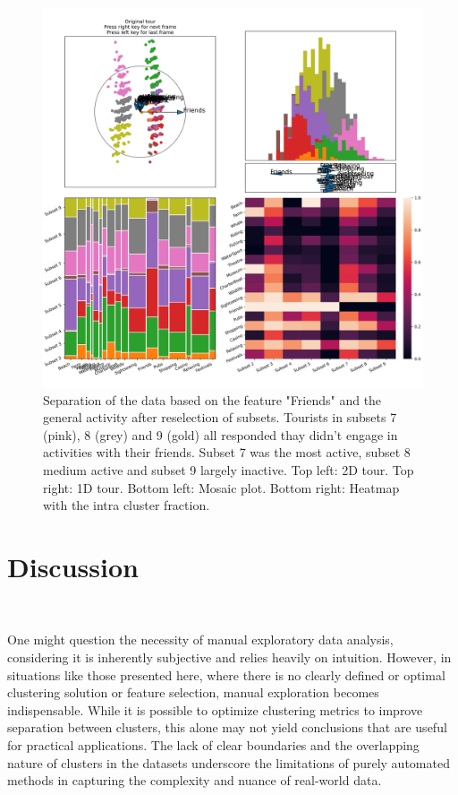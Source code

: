 \documentclass[article]{ajs}
\begin{document}
\begin{figure}[h!]
    \centering
    \includegraphics[width=1\textwidth]{aus_selection.png}
    \caption{Separation of the data based on the feature "Friends" and the general activity after reselection of subsets. 
    Tourists in subsets 7 (pink), 8 (grey) and 9 (gold) all responded thay didn't engage in activities with their friends. Subset 7 was the most active, subset 8 medium active and subset 9 largely inactive. Top left: 2D tour. Top right: 1D tour. Bottom left: Mosaic plot. Bottom right: Heatmap with the intra cluster fraction.}
    \label{fig:aus_selection}
\end{figure}


\section{Discussion}~\label{discussion}

One might question the necessity of manual exploratory data analysis, considering it is inherently subjective and relies heavily on intuition. However, in situations like those presented here, where there is no clearly defined or optimal clustering solution or feature selection, manual exploration becomes indispensable. While it is possible to optimize clustering metrics to improve separation between clusters, this alone may not yield conclusions that are useful for practical applications. The lack of clear boundaries and the overlapping nature of clusters in the datasets underscore the limitations of purely automated methods in capturing the complexity and nuance of real-world data.
\end{document}
